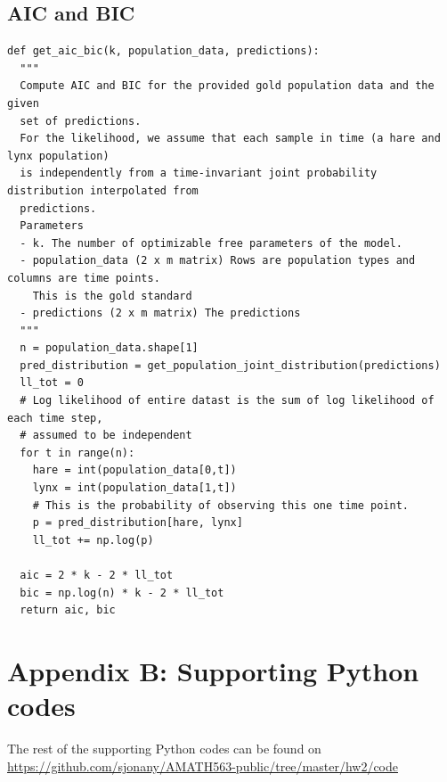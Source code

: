 \documentclass[letterpaper, 10 pt, conference]{ieeeconf}  %
\begin{document}
\subsection*{AIC and BIC}
\begin{verbatim}
def get_aic_bic(k, population_data, predictions):
  """
  Compute AIC and BIC for the provided gold population data and the given
  set of predictions.
  For the likelihood, we assume that each sample in time (a hare and lynx population)
  is independently from a time-invariant joint probability distribution interpolated from
  predictions.
  Parameters
  - k. The number of optimizable free parameters of the model.
  - population_data (2 x m matrix) Rows are population types and columns are time points.
    This is the gold standard
  - predictions (2 x m matrix) The predictions
  """
  n = population_data.shape[1]
  pred_distribution = get_population_joint_distribution(predictions)
  ll_tot = 0
  # Log likelihood of entire datast is the sum of log likelihood of each time step,
  # assumed to be independent
  for t in range(n):
    hare = int(population_data[0,t])
    lynx = int(population_data[1,t])
    # This is the probability of observing this one time point.
    p = pred_distribution[hare, lynx]
    ll_tot += np.log(p)
  
  aic = 2 * k - 2 * ll_tot
  bic = np.log(n) * k - 2 * ll_tot
  return aic, bic
\end{verbatim}

\section*{Appendix B: Supporting Python codes}
The rest of the supporting Python codes can be found on \url{https://github.com/sjonany/AMATH563-public/tree/master/hw2/code}
\end{document}
